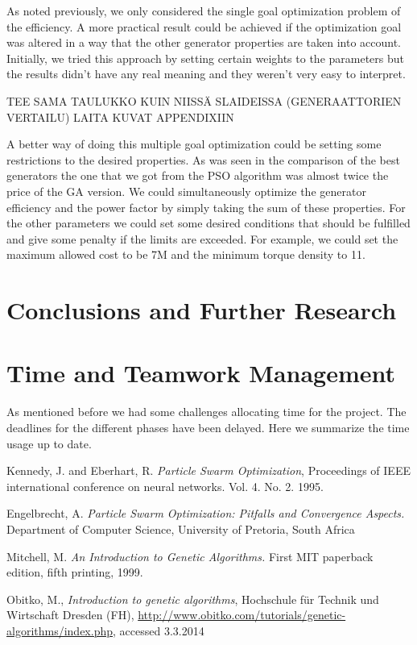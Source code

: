 \documentclass[twoside]{article}
\begin{document}
\begin{multicols}{2}
As noted previously, we only considered the single goal optimization problem of the efficiency. A more practical result could be achieved if the optimization goal was altered in a way that the other generator properties are taken into account. Initially, we tried this approach by setting certain weights to the parameters but the results didn't have any real meaning and they weren't very easy to interpret. 

TEE SAMA TAULUKKO KUIN NIISSÄ SLAIDEISSA (GENERAATTORIEN VERTAILU)
LAITA KUVAT APPENDIXIIN

A better way of doing this multiple goal optimization could be setting some restrictions to the desired properties. As was seen in the comparison of the best generators the one that we got from the PSO algorithm was almost twice the price of the GA version. We could simultaneously optimize the generator efficiency and the power factor by simply taking the sum of these properties. For the other parameters we could set some desired conditions that should be fulfilled and give some penalty if the limits are exceeded. For example, we could set the maximum allowed cost to be 7M and the minimum torque density to 11.


\section{Conclusions and Further Research}



\section{Time and Teamwork Management}
As mentioned before we had some challenges allocating time for the project. The deadlines for the different phases have been delayed. Here we summarize the time usage up to date.



\begin{thebibliography}{99} %
 Kennedy, J. and Eberhart, R.
  \emph{Particle Swarm Optimization},
 Proceedings of IEEE international conference on neural networks. Vol. 4. No. 2. 1995. 

 Engelbrecht, A. \emph{Particle Swarm Optimization: Pitfalls and Convergence Aspects.}
 Department of Computer Science, University of Pretoria, South Africa
 
Mitchell, M. \emph{An Introduction to Genetic Algorithms.} First MIT paperback edition, fifth printing, 1999. 
 
Obitko, M., \emph{Introduction to genetic algorithms}, Hochschule f\"ur Technik und Wirtschaft Dresden (FH), \url{http://www.obitko.com/tutorials/genetic-algorithms/index.php}, accessed 3.3.2014

\end{thebibliography}


\end{multicols}
\end{document}
